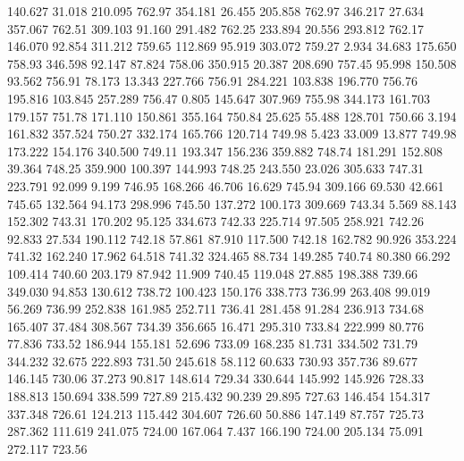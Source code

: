  140.627   31.018  210.095       762.97
 354.181   26.455  205.858       762.97
 346.217   27.634  357.067       762.51
 309.103   91.160  291.482       762.25
 233.894   20.556  293.812       762.17
 146.070   92.854  311.212       759.65
 112.869   95.919  303.072       759.27
   2.934   34.683  175.650       758.93
 346.598   92.147   87.824       758.06
 350.915   20.387  208.690       757.45
  95.998  150.508   93.562       756.91
  78.173   13.343  227.766       756.91
 284.221  103.838  196.770       756.76
 195.816  103.845  257.289       756.47
   0.805  145.647  307.969       755.98
 344.173  161.703  179.157       751.78
 171.110  150.861  355.164       750.84
  25.625   55.488  128.701       750.66
   3.194  161.832  357.524       750.27
 332.174  165.766  120.714       749.98
   5.423   33.009   13.877       749.98
 173.222  154.176  340.500       749.11
 193.347  156.236  359.882       748.74
 181.291  152.808   39.364       748.25
 359.900  100.397  144.993       748.25
 243.550   23.026  305.633       747.31
 223.791   92.099    9.199       746.95
 168.266   46.706   16.629       745.94
 309.166   69.530   42.661       745.65
 132.564   94.173  298.996       745.50
 137.272  100.173  309.669       743.34
   5.569   88.143  152.302       743.31
 170.202   95.125  334.673       742.33
 225.714   97.505  258.921       742.26
  92.833   27.534  190.112       742.18
  57.861   87.910  117.500       742.18
 162.782   90.926  353.224       741.32
 162.240   17.962   64.518       741.32
 324.465   88.734  149.285       740.74
  80.380   66.292  109.414       740.60
 203.179   87.942   11.909       740.45
 119.048   27.885  198.388       739.66
 349.030   94.853  130.612       738.72
 100.423  150.176  338.773       736.99
 263.408   99.019   56.269       736.99
 252.838  161.985  252.711       736.41
 281.458   91.284  236.913       734.68
 165.407   37.484  308.567       734.39
 356.665   16.471  295.310       733.84
 222.999   80.776   77.836       733.52
 186.944  155.181   52.696       733.09
 168.235   81.731  334.502       731.79
 344.232   32.675  222.893       731.50
 245.618   58.112   60.633       730.93
 357.736   89.677  146.145       730.06
  37.273   90.817  148.614       729.34
 330.644  145.992  145.926       728.33
 188.813  150.694  338.599       727.89
 215.432   90.239   29.895       727.63
 146.454  154.317  337.348       726.61
 124.213  115.442  304.607       726.60
  50.886  147.149   87.757       725.73
 287.362  111.619  241.075       724.00
 167.064    7.437  166.190       724.00
 205.134   75.091  272.117       723.56
